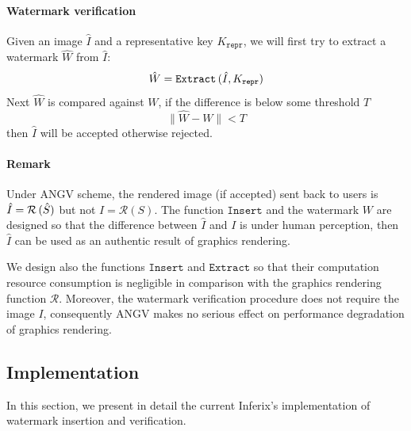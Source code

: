 \documentclass[a4paper,11pt,onecolumn]{memoir}
\begin{document}
\paragraph[Watermark verification]{Watermark verification}
Given an image $\hat{I}$ and a representative key $K_{\mathtt{repr}}$, we will first try to extract a watermark $\hat{W}$ from $\hat{I}$:
\begin{equation*}
    \hat{W} = \mathtt{Extract} \thinspace (\hat{I}, K_{\mathtt{repr}})
\end{equation*}
Next $\hat{W}$ is compared against $W$, if the difference is below some threshold $T$
\begin{equation*}
    \lVert \hat{W} - W \rVert < T
\end{equation*}
then $\hat{I}$ will be accepted otherwise rejected.

\paragraph[Remark]{Remark}
Under ANGV scheme, the rendered image (if accepted) sent back to users is $\hat{I} = \mathcal{R}\thinspace(\hat{S})$ but not $I = \mathcal{R}\left(S\right)$. The function $\mathtt{Insert}$ and the watermark $W$ are designed so that the difference between $\hat{I}$ and $I$ is under human perception, then $\hat{I}$ can be used as an authentic result of graphics rendering.

We design also the functions $\mathtt{Insert}$ and $\mathtt{Extract}$ so that their computation resource consumption is negligible in comparison with the graphics rendering function $\mathcal{R}$. Moreover, the watermark verification procedure does not require the image $I$, consequently ANGV makes no serious effect on performance degradation of graphics rendering.
 

\subsection[Implementation]{Implementation}
In this section, we present in detail the current Inferix's implementation of watermark insertion and verification.

\end{document}
